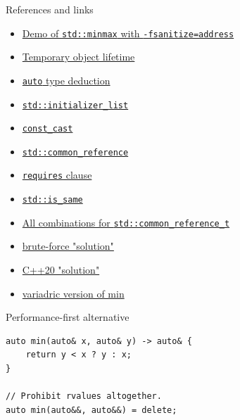 \documentclass[aspectratio=169]{beamer}
\begin{document}
\begin{frame}[fragile]{References and links}
    \begin{itemize}
        \item \href{https://godbolt.org/z/5Tv3zfTPP}{Demo of \texttt{std::minmax} with \texttt{-fsanitize=address}}
        \item \href{https://en.cppreference.com/w/cpp/language/lifetime#Temporary_object_lifetime}{Temporary object lifetime}
        \item \href{https://en.cppreference.com/w/cpp/language/template_argument_deduction#auto_type_deduction}{\texttt{auto} type deduction}
        \item \href{https://en.cppreference.com/w/cpp/utility/initializer_list}{\texttt{std::initializer_list}}
        \item \href{https://en.cppreference.com/w/cpp/language/const_cast}{\texttt{const_cast}}
        \item \href{https://en.cppreference.com/w/cpp/types/common_reference}{\texttt{std::common_reference}}
        \item \href{https://en.cppreference.com/w/cpp/language/constraints#Requires_clauses}{\texttt{requires} clause}
        \item \href{https://en.cppreference.com/w/cpp/types/is_same}{\texttt{std::is_same}}
        \item \href{https://godbolt.org/z/1vGxe4Yqr}{All combinations for  \texttt{std::common_reference_t}}
        \item \href{https://godbolt.org/z/ejvKx8YEh}{brute-force "solution"}
        \item \href{https://godbolt.org/z/6qdGvczz3}{C++20 "solution"}
        \item \href{https://godbolt.org/z/8x8sPYG4v}{variadric version of min}
    \end{itemize}
\end{frame}

\begin{frame}[c]{}
\end{frame}

\begin{frame}[fragile]{Performance-first alternative}
\begin{verbatim}
auto min(auto& x, auto& y) -> auto& {
    return y < x ? y : x;
}

// Prohibit rvalues altogether.
auto min(auto&&, auto&&) = delete;
\end{verbatim}
\end{frame}
\end{document}
